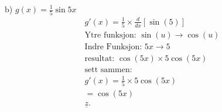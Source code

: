 \documentclass{report}
\begin{document}
b) $\displaystyle g(x) = \frac{1}{5} \sin 5x$
\begin{align*}
	g'(x) = \frac{1}{5} \times \frac{d}{dx} \left[ \sin(5) \right] \\
	\text{Ytre funksjon: } \sin(u) \to \cos(u) \\
	\text{Indre Funksjon: } 5x \to 5\\
	\text{resultat: } \cos(5x) \times 5\cos(5x)\\
	\text{sett sammen:}\\
	g'(x) = \frac{1}{5} \times 5\cos(5x)\\
	= \cos(5x) \\
	\underline{z}
.\end{align*}
\end{document}

